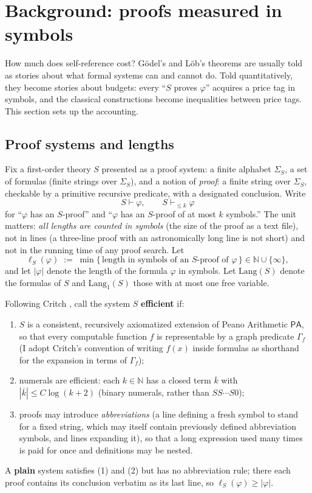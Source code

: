 \documentclass[11pt]{amsart}
\theoremstyle{plain}
\theoremstyle{definition}
\newcommand{\PA}{\mathsf{PA}}
\newcommand{\Lang}{\mathrm{Lang}}
\newcommand{\num}[1]{\overline{#1}}
\begin{document}
\section{Background: proofs measured in symbols}
\label{sec:background}

How much does self-reference cost? G\"odel's and L\"ob's theorems are usually told as stories about what formal systems can and cannot do. Told quantitatively, they become stories about budgets: every ``$S$ proves $\varphi$'' acquires a price tag in symbols, and the classical constructions become inequalities between price tags. This section sets up the accounting.

\subsection{Proof systems and lengths}
\label{sec:systems}

Fix a first-order theory $S$ presented as a proof system: a finite alphabet $\Sigma_S$, a set of formulas (finite strings over $\Sigma_S$), and a notion of \emph{proof}: a finite string over $\Sigma_S$, checkable by a primitive recursive predicate, with a designated conclusion. Write
\[
S \vdash \varphi, \qquad S \vdash_{\le k} \varphi
\]
for ``$\varphi$ has an $S$-proof'' and ``$\varphi$ has an $S$-proof of at most $k$ symbols.'' The unit matters: \emph{all lengths are counted in symbols} (the size of the proof as a text file), not in lines (a three-line proof with an astronomically long line is not short) and not in the running time of any proof search. Let
\[
\ell_S(\varphi) \;:=\; \min\{\,\text{length in symbols of an $S$-proof of } \varphi\,\} \in \mathbb{N} \cup \{\infty\},
\]
and let $|\varphi|$ denote the length of the formula $\varphi$ in symbols. Let $\Lang(S)$ denote the formulas of $S$ and $\Lang_1(S)$ those with at most one free variable.

Following Critch \cite{critch2016}, call the system $S$ \textbf{efficient} if:
\begin{enumerate}
\item $S$ is a consistent, recursively axiomatized extension of Peano Arithmetic $\PA$, so that every computable function $f$ is representable by a graph predicate $\Gamma_f$ (I adopt Critch's convention of writing $f(x)$ inside formulas as shorthand for the expansion in terms of $\Gamma_f$);
\item numerals are efficient: each $k \in \mathbb{N}$ has a closed term $\num{k}$ with $|\num{k}| \le C\log(k+2)$ (binary numerals, rather than $SS\cdots S0$);
\item proofs may introduce \emph{abbreviations} (a line defining a fresh symbol to stand for a fixed string, which may itself contain previously defined abbreviation symbols, and lines expanding it), so that a long expression used many times is paid for once and definitions may be nested.
\end{enumerate}
A \textbf{plain} system satisfies (1) and (2) but has no abbreviation rule; there each proof contains its conclusion verbatim as its last line, so $\ell_S(\varphi) \ge |\varphi|$.
\end{document}
